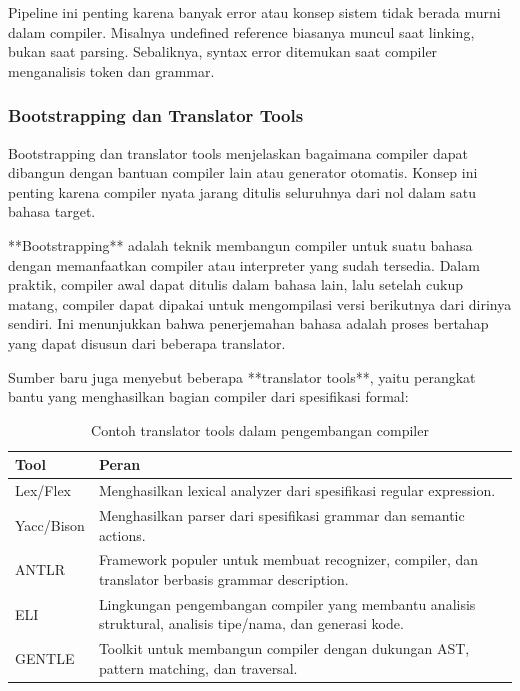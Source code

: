Pipeline ini penting karena banyak error atau konsep sistem tidak berada murni dalam compiler. Misalnya undefined reference biasanya muncul saat linking, bukan saat parsing. Sebaliknya, syntax error ditemukan saat compiler menganalisis token dan grammar.

\subsubsection{Bootstrapping dan Translator Tools}

\begin{jawab}
Bootstrapping dan translator tools menjelaskan bagaimana compiler dapat dibangun dengan bantuan compiler lain atau generator otomatis. Konsep ini penting karena compiler nyata jarang ditulis seluruhnya dari nol dalam satu bahasa target.
\end{jawab}

**Bootstrapping** adalah teknik membangun compiler untuk suatu bahasa dengan memanfaatkan compiler atau interpreter yang sudah tersedia. Dalam praktik, compiler awal dapat ditulis dalam bahasa lain, lalu setelah cukup matang, compiler dapat dipakai untuk mengompilasi versi berikutnya dari dirinya sendiri. Ini menunjukkan bahwa penerjemahan bahasa adalah proses bertahap yang dapat disusun dari beberapa translator.

Sumber baru juga menyebut beberapa **translator tools**, yaitu perangkat bantu yang menghasilkan bagian compiler dari spesifikasi formal:

\begin{table}[H]
\centering
\begin{tabularx}{\textwidth}{|L{0.20\textwidth}|X|}
\hline
\textbf{Tool} & \textbf{Peran} \\
\hline
Lex/Flex & Menghasilkan lexical analyzer dari spesifikasi regular expression. \\
\hline
Yacc/Bison & Menghasilkan parser dari spesifikasi grammar dan semantic actions. \\
\hline
ANTLR & Framework populer untuk membuat recognizer, compiler, dan translator berbasis grammar description. \\
\hline
ELI & Lingkungan pengembangan compiler yang membantu analisis struktural, analisis tipe/nama, dan generasi kode. \\
\hline
GENTLE & Toolkit untuk membangun compiler dengan dukungan AST, pattern matching, dan traversal. \\
\hline
\end{tabularx}
\caption{Contoh translator tools dalam pengembangan compiler}
\label{tab:translator-tools}
\end{table}

